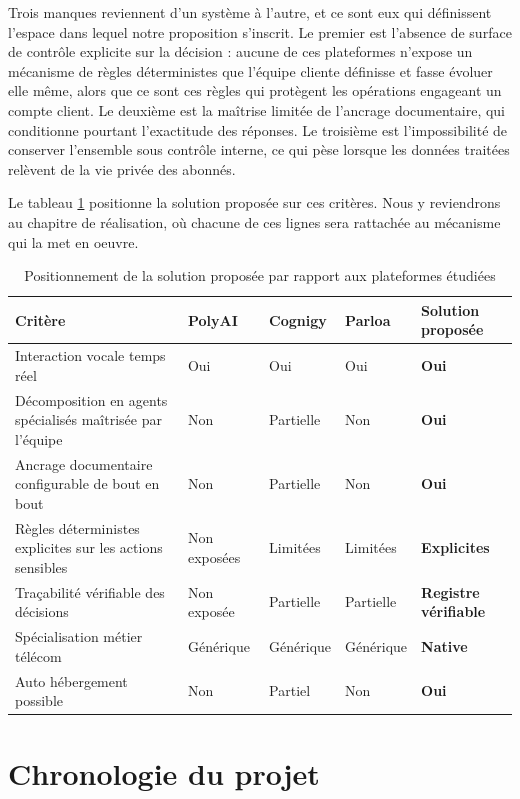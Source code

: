 Trois manques reviennent d'un système à l'autre, et ce sont eux qui définissent l'espace dans lequel notre proposition s'inscrit. Le premier est l'absence de surface de contrôle explicite sur la décision : aucune de ces plateformes n'expose un mécanisme de règles déterministes que l'équipe cliente définisse et fasse évoluer elle même, alors que ce sont ces règles qui protègent les opérations engageant un compte client. Le deuxième est la maîtrise limitée de l'ancrage documentaire, qui conditionne pourtant l'exactitude des réponses. Le troisième est l'impossibilité de conserver l'ensemble sous contrôle interne, ce qui pèse lorsque les données traitées relèvent de la vie privée des abonnés.

Le tableau \ref{tab:positionnement} positionne la solution proposée sur ces critères. Nous y reviendrons au chapitre de réalisation, où chacune de ces lignes sera rattachée au mécanisme qui la met en oeuvre.

\begin{table}[H]
\centering
\renewcommand{\arraystretch}{1.25}
\begin{tabular}{|p{4.9cm}|p{2.1cm}|p{2.1cm}|p{2.1cm}|p{2.4cm}|}
\hline
\textbf{Critère} & \textbf{PolyAI} & \textbf{Cognigy} & \textbf{Parloa} & \textbf{Solution proposée} \\
\hline
Interaction vocale temps réel & Oui & Oui & Oui & \textbf{Oui} \\
\hline
Décomposition en agents spécialisés maîtrisée par l'équipe & Non & Partielle & Non & \textbf{Oui} \\
\hline
Ancrage documentaire configurable de bout en bout & Non & Partielle & Non & \textbf{Oui} \\
\hline
Règles déterministes explicites sur les actions sensibles & Non exposées & Limitées & Limitées & \textbf{Explicites} \\
\hline
Traçabilité vérifiable des décisions & Non exposée & Partielle & Partielle & \textbf{Registre vérifiable} \\
\hline
Spécialisation métier télécom & Générique & Générique & Générique & \textbf{Native} \\
\hline
Auto hébergement possible & Non & Partiel & Non & \textbf{Oui} \\
\hline
\end{tabular}
\caption{Positionnement de la solution proposée par rapport aux plateformes étudiées}
\label{tab:positionnement}
\end{table}

\section{Chronologie du projet}

